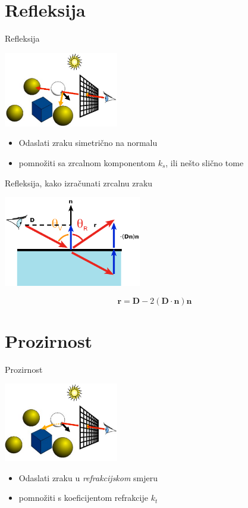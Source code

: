 \documentclass[9pt]{beamer}
\begin{document}
\section{Refleksija}
\begin{frame}{Refleksija}

\begin{center}
\includegraphics[width=5cm]{slike/refleksija_01.png}
\end{center}
\begin{itemize}
\item Odaslati zraku simetrično na normalu
\item pomnožiti sa zrcalnom komponentom $k_s$, ili nešto slično tome
\end{itemize}
\end{frame}

\begin{frame}{Refleksija, kako izračunati zrcalnu zraku}

\begin{center}
\includegraphics[width=6cm]{slike/refleksija_02.png}
\end{center}
$$\mathbf{r} = \mathbf{D} - 2(\mathbf{D}\cdot \mathbf{n})\mathbf{n}$$
\end{frame}


\section{Prozirnost}
\begin{frame}{Prozirnost}

\begin{center}
\includegraphics[width=5cm]{slike/prozirnost_01.png}
\end{center}
\begin{itemize}
\item Odaslati zraku u \textit{refrakcijskom} smjeru
\item pomnožiti s koeficijentom refrakcije $k_t$
\end{itemize}
\end{frame}
\end{document}
